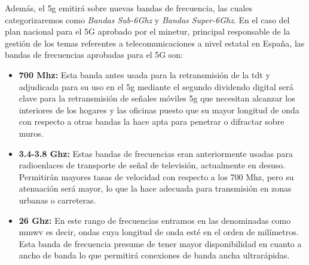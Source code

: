 \par Además, el \gls{5g} emitirá sobre nuevas bandas de frecuencia, las cuales categorizaremos como \textit{Bandas Sub-6Ghz} y \textit{Bandas Super-6Ghz}. En el caso del plan nacional para el 5G aprobado por el \gls{minetur}, principal responsable de la gestión de los temas referentes a telecomunicaciones a nivel estatal en España, las bandas de frecuencias aprobadas para el 5G son:
\begin{itemize}
\item\textbf{700 Mhz:} Esta banda antes usada para la retransmisión de la \gls{tdt} y adjudicada para su uso en el \gls{5g} mediante el segundo dividendo digital será clave para la retransmisión de señales móviles \gls{5g} que necesitan alcanzar los interiores de los hogares y las oficinas puesto que su mayor longitud de onda con respecto a otras bandas la hace apta para penetrar o difractar sobre muros.
\item\textbf{3.4-3.8 Ghz: }Estas bandas de frecuencias eran anteriormente usadas para radioenlaces de transporte de señal de televisión, actualmente en desuso. Permitirán mayores tasas de velocidad con respecto a los 700 Mhz, pero su atenuación será mayor, lo que la hace adecuada para transmisión en zonas urbanas o carreteras.
\item\textbf{26 Ghz: }En este rango de frecuencias entramos en las denominadas como \gls{mmwv} es decir, ondas cuya longitud de onda esté en el orden de milímetros. Esta banda de frecuencia presume de tener mayor disponibilidad en cuanto a ancho de banda lo que permitirá conexiones de banda ancha ultrarápidas.
\end{itemize}

